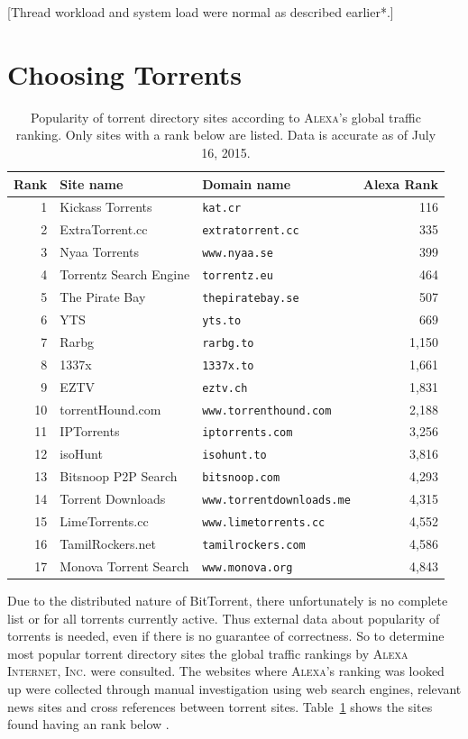 \documentclass[10pt, a4paper, twoside, headsepline]{scrbook}
\renewcommand{\_}{\origunderscore\allowbreak}
\begin{document}
[Thread workload and system load were normal as described earlier*.]

\section{Choosing Torrents}
\begin{table}
\centering
\begin{tabular}{rllr}
\toprule
Rank & Site name & Domain name & Alexa Rank \\
\midrule
1 & Kickass Torrents & \texttt{kat.cr} & 116 \\
2 & ExtraTorrent.cc & \texttt{extratorrent.cc} & 335 \\
3 & Nyaa Torrents & \texttt{www.nyaa.se} & 399 \\
4 & Torrentz Search Engine & \texttt{torrentz.eu} & 464 \\
5 & The Pirate Bay & \texttt{thepiratebay.se} & 507 \\
6 & YTS & \texttt{yts.to} & 669 \\
7 & Rarbg & \texttt{rarbg.to} & 1,150 \\
8 & 1337x & \texttt{1337x.to} & 1,661 \\
9 & EZTV & \texttt{eztv.ch} & 1,831 \\
10 & torrentHound.com & \texttt{www.torrenthound.com} & 2,188 \\
11 & IPTorrents & \texttt{iptorrents.com} & 3,256 \\
12 & isoHunt & \texttt{isohunt.to} & 3,816 \\
13 & Bitsnoop P2P Search & \texttt{bitsnoop.com} & 4,293 \\
14 & Torrent Downloads & \texttt{www.torrentdownloads.me} & 4,315 \\
15 & LimeTorrents.cc & \texttt{www.limetorrents.cc} & 4,552 \\
16 & TamilRockers.net & \texttt{tamilrockers.com} & 4,586 \\
17 & Monova Torrent Search & \texttt{www.monova.org} & 4,843 \\
\bottomrule
\end{tabular}
\caption[Popular torrent directory sites according to \textsc{Alexa}]{Popularity of torrent directory sites according to \textsc{Alexa}'s \cite{alexa} global traffic ranking. Only sites with a rank below  are listed. Data is accurate as of July 16, 2015.}
\label{torrentsites}
\end{table}

Due to the distributed nature of BitTorrent, there unfortunately is no complete list or for all torrents currently active. Thus external data about popularity of torrents is needed, even if there is no guarantee of correctness. So to determine most popular torrent directory sites the global traffic rankings by \textsc{Alexa Internet, Inc.} \cite{alexa} were consulted. The websites where \textsc{Alexa}'s ranking was looked up were collected through manual investigation using web search engines, relevant news sites and cross references between torrent sites. Table~\ref{torrentsites} shows the  sites found having an rank below .
\end{document}
